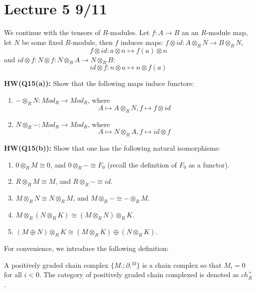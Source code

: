 \section{Lecture 5 9/11}
We continue with the tensors of $R$-modules. Let $f:A\to B$ an an $R$-module map, let $N$ be some fixed $R$-module, then $f$ induces maps:  $f\otimes id: A\otimes_R N\to B\otimes_R N$, 
\begin{equation*}
    f\otimes id: a\otimes n\mapsto f(a)\otimes n
\end{equation*}
and $id\otimes f: N\otimes f: N\otimes_R A\to N\otimes_R B:$
\begin{equation*}
    id\otimes f: n\otimes a\mapsto n\otimes f(a)
\end{equation*}
\begin{prob}
    \textbf{HW(Q15(a)): } Show that the following maps induce functors:
    \begin{enumerate}
        \item $-\otimes_R N: Mod_R\to Mod_R$, where 
        \begin{equation*}
            A\mapsto A\otimes_R N, f\mapsto f\otimes id
        \end{equation*}
        \item $N\otimes_R -: Mod_R\to Mod_R$, where \begin{equation*}
            A\mapsto N\otimes_R A, f\mapsto id\otimes f
        \end{equation*}
    \end{enumerate}
\end{prob}


\begin{prob}
    \textbf{HW(Q15(b)):} Show that one has the following natural isomorphisms:
    \begin{enumerate}
        \item $0\otimes_R M\cong 0$, and $0\otimes_R -\cong F_0$ (recall the definition of $F_0$ as a functor).
        \item $R\otimes_R M\cong M$, and $R\otimes_R-\cong id$.
        \item $M\otimes_R N\cong N\otimes_R M$, and $M\otimes_R-\cong -\otimes_R M$.
        \item $M\otimes_R(N\otimes_R K)\cong (M\otimes_R N)\otimes_R K$.
        \item $(M\oplus N)\otimes_RK\cong (M\otimes_R K)\oplus(N\otimes_R K)$.
    \end{enumerate}
\end{prob}
For convenience, we introduce the following definition:
\begin{defn}
    A positively graded chain complex $\{M.;\partial.^M\}$ is a chain complex so that $M_i=0$ for all $i<0$. The category of positively graded chain complexed is denoted as $ch_R^+$.
\end{defn}


